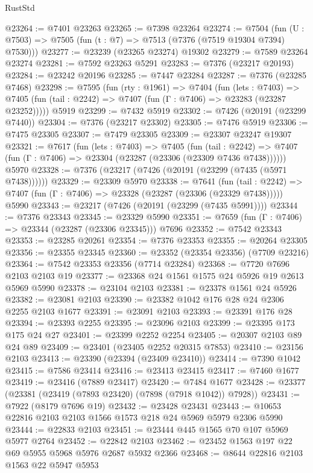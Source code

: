 \begin{lexlean}{RustStd}
\begin{coremodule}
@23264 := @7401 @23263
@23265 := @7398 @23264
@23274 := @7504
    (fun (U : @7503) => @7505 (fun (t : @7) => @7513 (@7376 (@7519 @19304 @7394) @7530)))
@23277 := @23239 (@23265 @23274) @19302
@23279 := @7589 @23264 @23274
@23281 := @7592 @23263 @5291
@23283 := @7376 (@23217 @20193)
@23284 := @23242 @20196
@23285 := @7447 @23284
@23287 := @7376 (@23285 @7468)
@23298 := @7595
    (fun (rty : @1961) =>
    @7404
      (fun (lets : @7403) =>
      @7405 (fun (tail : @2242) => @7407 (fun (Γ : @7406) => @23283 (@23287 @23252)))))
    @5919
@23299 := @7432 @5919
@23302 := @7426 (@20191 (@23299 @7440))
@23304 := @7376 (@23217 @23302)
@23305 := @7476 @5919
@23306 := @7475 @23305
@23307 := @7479 @23305
@23309 := @23307 @23247 @19307
@23321 := @7617
    (fun (lets : @7403) =>
    @7405
      (fun (tail : @2242) =>
      @7407 (fun (Γ : @7406) => @23304 (@23287 (@23306 (@23309 @7436 @7438))))))
    @5970
@23328 := @7376 (@23217 (@7426 (@20191 (@23299 (@7435 (@5971 @7438))))))
@23329 := @23309 @5970
@23338 := @7641
    (fun (tail : @2242) => @7407 (fun (Γ : @7406) => @23328 (@23287 (@23306 (@23329 @7438)))))
    @5990
@23343 := @23217 (@7426 (@20191 (@23299 (@7435 @5991))))
@23344 := @7376 @23343
@23345 := @23329 @5990
@23351 := @7659 (fun (Γ : @7406) => @23344 (@23287 (@23306 @23345))) @7696
@23352 := @7542 @23343
@23353 := @23285 @20261
@23354 := @7376 @23353
@23355 := @20264 @23305
@23356 := @23355 @23345
@23360 := @23352 (@23354 @23356) (@7709 @23216)
@23364 := @7542 @23353 @23356 (@7714 @23284)
@23368 := @7720 @7696 @2103 @2103 @19
@23377 := @23368 @24 @1561 @1575 @24 @5926 @19 @2613 @5969 @5990
@23378 := @23104 @2103
@23381 := @23378 @1561 @24 @5926
@23382 := @23081 @2103
@23390 := @23382 @1042 @176 @28 @24 @2306 @2255 @2103 @1677
@23391 := @23091 @2103
@23393 := @23391 @176 @28
@23394 := @23393 @2255
@23395 := @23096 @2103
@23399 := @23395 @173 @175 @24 @27
@23401 := @23399 @2252 @2254
@23405 := @20307 @2103 @89 @24 @89
@23409 := @23401 (@23405 @2252 @20315 @7853)
@23410 := @23156 @2103
@23413 := @23390 (@23394 (@23409 @23410))
@23414 := @7390 @1042
@23415 := @7586 @23414
@23416 := @23413 @23415
@23417 := @7460 @1677
@23419 := @23416 (@7889 @23417)
@23420 := @7484 @1677
@23428 := @23377 (@23381 (@23419 (@7893 @23420) (@7898 (@7918 @1042)) @7928))
@23431 := @7922 (@8179 @7696 @19)
@23432 := @23428 @23431
@23443 := @10653 @22816 @2103 @2103 @1566 @1573 @218 @24 @5969 @5979 @2306 @5990
@23444 := @22833 @2103
@23451 := @23444 @445 @1565 @70 @107 @5969 @5977 @2764
@23452 := @22842 @2103
@23462 := @23452 @1563 @197 @22 @69 @5955 @5968 @5976 @2687 @5932 @2366
@23468 := @8644 @22816 @2103 @1563 @22 @5947 @5953

\end{coremodule}
\end{lexlean}
